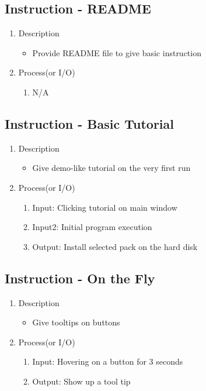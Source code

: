 \documentclass[conference]{IEEEtran}
\begin{document}
\begin{itemize}
\begin{itemize}
\begin{itemize}
\begin{itemize}
\subsection{Instruction - README}
\begin{enumerate}
  \item Description
  \begin{itemize}
    \item Provide README file to give basic instruction
  \end{itemize}
  \item Process(or I/O)
  \begin{enumerate}
    \item N/A
  \end{enumerate}
\end{enumerate}


\textit{}

\subsection{Instruction - Basic Tutorial}
\begin{enumerate}
  \item Description
  \begin{itemize}
    \item Give demo-like tutorial on the very first run
  \end{itemize}
  \item Process(or I/O)
  \begin{enumerate}
    \item Input: Clicking tutorial on main window
    \item Input2: Initial program execution
    \item Output: Install selected pack on the hard disk
  \end{enumerate}
\end{enumerate}


\textit{}

\subsection{Instruction - On the Fly}
\begin{enumerate}
  \item Description
  \begin{itemize}
    \item Give tooltips on buttons
  \end{itemize}
  \item Process(or I/O)
  \begin{enumerate}
    \item Input: Hovering on a button for 3 seconds
    \item Output: Show up a tool tip
  \end{enumerate}
\end{enumerate}


\end{itemize}
\end{itemize}
\end{itemize}
\end{itemize}
\end{document}
